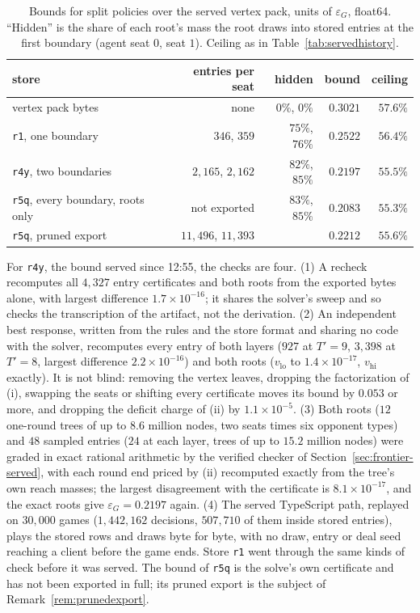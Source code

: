 \documentclass[11pt]{article}
\theoremstyle{plain}
\theoremstyle{definition}
\theoremstyle{remark}
\newcommand{\code}[1]{\texttt{\small #1}}
\newcommand{\game}{\ensuremath{G}}
\newcommand{\epsG}{\ensuremath{\varepsilon_{\game}}}
\begin{document}
\begin{table}[t]
\centering
\caption{Bounds for split policies over the served vertex pack, units
of $\epsG$, float64. ``Hidden'' is the share of each root's mass the
root draws into stored entries at the first boundary (agent seat $0$,
seat $1$). Ceiling as in Table~\ref{tab:servedhistory}.}
\label{tab:splitbounds}
\small
\begin{tabular}{@{}>{\raggedright\arraybackslash}p{5.2cm}rrrr@{}}
\toprule
store & entries per seat & hidden & bound & ceiling\\
\midrule
vertex pack bytes & none & $0\%$, $0\%$ & $0.3021$ & $57.6\%$\\
\code{r1}, one boundary & $346$, $359$ & $75\%$, $76\%$ & $0.2522$ & $56.4\%$\\
\code{r4y}, two boundaries & $2{,}165$, $2{,}162$ & $82\%$, $85\%$ & $0.2197$ & $55.5\%$\\
\code{r5q}, every boundary, roots only & not exported & $83\%$, $85\%$ & $0.2083$ & $55.3\%$\\
\code{r5q}, pruned export & $11{,}496$, $11{,}393$ & & $0.2212$ & $55.6\%$\\
\bottomrule
\end{tabular}
\end{table}

For \code{r4y}, the bound served since 12:55, the checks are four. (1)
A recheck recomputes all $4{,}327$ entry certificates and both roots
from the exported bytes alone, with largest difference
$1.7\times10^{-16}$; it shares the solver's sweep and so checks the
transcription of the artifact, not the derivation. (2) An independent
best response, written from the rules and the store format and sharing
no code with the solver, recomputes every entry of both layers ($927$
at $T'=9$, $3{,}398$ at $T'=8$, largest difference
$2.2\times10^{-16}$) and both roots ($v_{\mathrm{lo}}$ to
$1.4\times10^{-17}$, $v_{\mathrm{hi}}$ exactly). It is not blind:
removing the vertex leaves, dropping the factorization of (i),
swapping the seats or shifting every certificate moves its bound by
$0.053$ or more, and dropping the deficit charge of (ii) by
$1.1\times10^{-5}$. (3) Both roots ($12$ one-round trees of up to $8.6$ million
nodes, two seats times six opponent types) and $48$ sampled entries
($24$ at each layer, trees of up to $15.2$ million nodes) were graded in
exact rational arithmetic by the verified checker of
Section~\ref{sec:frontier-served}, with each round end priced by (ii)
recomputed exactly from the tree's own reach masses; the largest
disagreement with the certificate is $8.1\times10^{-17}$, and the exact
roots give $\epsG=0.2197$ again. (4) The served TypeScript path,
replayed on $30{,}000$ games ($1{,}442{,}162$ decisions, $507{,}710$ of
them inside stored entries), plays the stored rows and draws byte for
byte, with no draw, entry or deal seed reaching a client before the game
ends. Store \code{r1} went through the same kinds of check before it
was served. The bound of \code{r5q} is the solve's own certificate and
has not been exported in full; its pruned export is the subject of
Remark~\ref{rem:prunedexport}.
\end{document}
